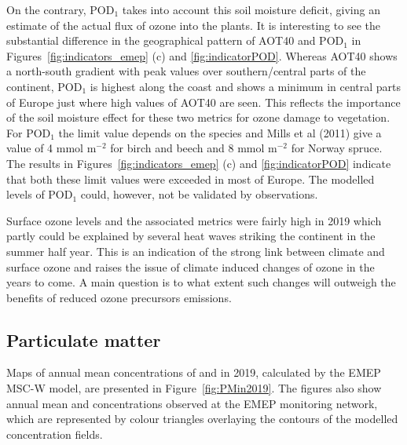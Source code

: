 On the contrary, POD$_1$ takes into account this soil moisture deficit, giving an estimate of the actual flux of ozone into the plants. It is interesting to see the substantial difference in the geographical pattern of AOT40 and POD$_1$ in Figures~\ref{fig:indicators_emep} (c) and \ref{fig:indicatorPOD}. Whereas AOT40 shows a north-south gradient with peak values over southern/central parts of the continent, POD$_1$ is highest along the coast and shows a minimum in central parts of Europe just where high values of AOT40 are seen. This reflects the importance of the soil moisture effect for these two metrics for ozone damage to vegetation. For POD$_1$ the limit value depends on the species and Mills et al (2011) give a value of 4 mmol m$^{-2}$ for birch and beech and 8 mmol m$^{-2}$ for Norway spruce. The results in Figures~\ref{fig:indicators_emep} (c) and \ref{fig:indicatorPOD} indicate that both these limit values were exceeded in most of Europe. The modelled levels of POD$_1$ could, however, not be validated by observations. 

Surface ozone levels and the associated metrics were fairly high in 2019 which partly could be explained by several heat waves striking the continent in the summer half year. This is an indication of the strong link between climate and surface ozone and raises the issue of climate induced changes of ozone in the years to come. A main question is to what extent such changes will outweigh the benefits of reduced ozone precursors emissions. 


\subsection{Particulate matter} 
\label{subs:PMstatus}

Maps of annual mean concentrations of \PM[10] and \PM[2.5] in 2019,
calculated by the EMEP MSC-W model, are presented in
Figure~\ref{fig:PMin2019}. The figures also show annual mean \PM[10]
and \PM[2.5] concentrations observed at the EMEP monitoring network,
which are represented by colour triangles overlaying the contours of the
modelled concentration fields.

